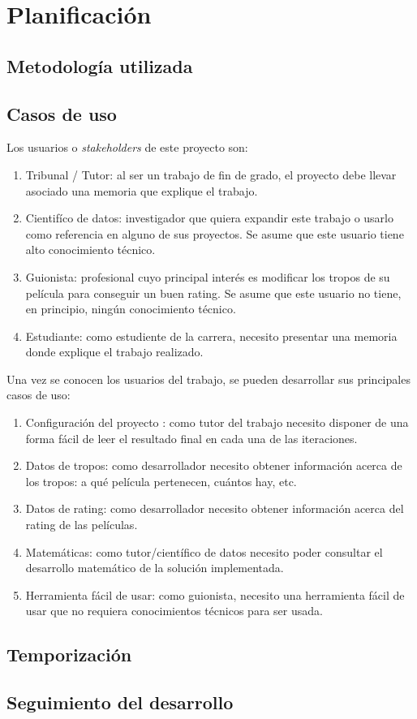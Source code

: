 \chapter{Planificación}

\section{Metodología utilizada}


\section{Casos de uso}

Los usuarios o \textit{stakeholders} de este proyecto son:

\begin{enumerate}
      \item Tribunal / Tutor: al ser un trabajo de fin de grado, el proyecto debe llevar asociado una memoria
            que explique el trabajo.
      \item Cientifíco de datos: investigador que quiera expandir este trabajo o usarlo como
            referencia en alguno de sus proyectos. Se asume que este usuario tiene alto conocimiento técnico.
      \item Guionista: profesional cuyo principal interés es modificar los tropos de su película para
            conseguir un buen rating. Se asume que este usuario no tiene, en principio, ningún conocimiento
            técnico.
      \item Estudiante: como estudiente de la carrera, necesito presentar una memoria donde explique el trabajo realizado.
\end{enumerate}

Una vez se conocen los usuarios del trabajo, se pueden desarrollar sus principales casos de uso:

\begin{enumerate}
      \item \label{uc:configuration} Configuración del proyecto \cite{configuration_milestone}: como
            tutor del trabajo necesito disponer de una forma fácil de leer el resultado final en cada
            una de las iteraciones.
      \item \label{uc:trope_data} Datos de tropos: como desarrollador necesito obtener información acerca de los
            tropos: a qué película pertenecen, cuántos hay, etc.
      \item \label{uc:rating_data} Datos de rating: como desarrollador necesito obtener información acerca del rating
            de las películas.
      \item \label{uc:math} Matemáticas: como tutor/científico de datos necesito poder consultar el desarrollo
            matemático de la solución implementada.
      \item \label{uc:user_friendly_tool} Herramienta fácil de usar: como guionista, necesito una herramienta
            fácil de usar que no requiera conocimientos técnicos para ser usada.
\end{enumerate}

\section{Temporización}

\section{Seguimiento del desarrollo}
